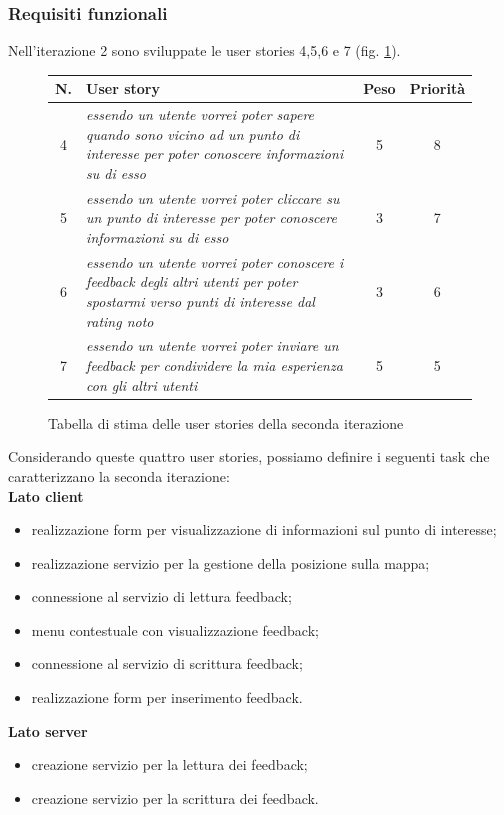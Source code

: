 \subsubsection{Requisiti funzionali}
Nell'iterazione 2 sono sviluppate le user stories 4,5,6 e 7 (fig. \ref{userstoriestablesecondaiterazione}). 
\begin{figure}
\begin{center}
\begin{tabular}[c]{|c|p{10cm}|c|c|}
\hline
N. & User story & Peso & Priorità\\
\hline
4 & \textit{essendo un utente vorrei poter sapere quando sono vicino ad un punto di interesse per poter conoscere informazioni su di esso} & 5 & 8\\
\hline
5 & \textit{essendo un utente vorrei poter cliccare su un punto di interesse per poter conoscere informazioni su di esso} & 3 & 7\\
\hline
6 & \textit{essendo un utente vorrei poter conoscere i feedback degli altri utenti per poter spostarmi verso punti di interesse dal rating noto} & 3 & 6\\
\hline
7 & \textit{essendo un utente vorrei poter inviare un feedback per condividere la mia esperienza con gli altri utenti} & 5 & 5\\
\hline
\end{tabular}
\caption{Tabella di stima delle user stories della seconda iterazione\label{userstoriestablesecondaiterazione}}
\end{center}
\end{figure}

Considerando queste quattro user stories, possiamo definire i seguenti task che caratterizzano la seconda iterazione:\\
\textbf{Lato client}
\begin{itemize}
\item realizzazione form per visualizzazione di informazioni sul punto di interesse;
\item realizzazione servizio per la gestione della posizione sulla mappa;
\item connessione al servizio di lettura feedback;
\item menu contestuale con visualizzazione feedback;
\item connessione al servizio di scrittura feedback;
\item realizzazione form per inserimento feedback.
\end{itemize}

\textbf{Lato server}
\begin{itemize}
\item creazione servizio per la lettura dei feedback;
\item creazione servizio per la scrittura dei feedback.
\end{itemize}


